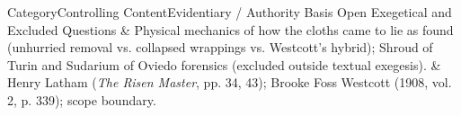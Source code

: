 \begin{threestable}{Category}{Controlling Content}{Evidentiary / Authority Basis}
\midrule
Open Exegetical and Excluded Questions & Physical mechanics of how the cloths came to lie as found (unhurried removal vs. collapsed wrappings vs. Westcott's hybrid); Shroud of Turin and Sudarium of Oviedo forensics (excluded outside textual exegesis). & Henry Latham (\emph{The Risen Master}, pp. 34, 43); Brooke Foss Westcott (1908, vol. 2, p. 339); scope boundary. \\
\end{threestable}
